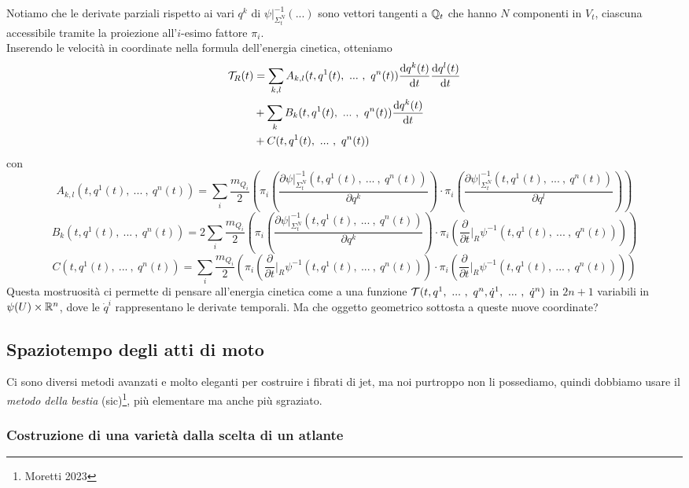 \documentclass[openany]{book}
\begin{document}
Notiamo che le derivate parziali rispetto ai vari $q^k$ di $\psi|_{\Sigma_t^N}^{-1}(...)$ sono vettori tangenti a $\mathbb{Q}_t$ che hanno $N$ componenti in $V_t$, ciascuna accessibile tramite la proiezione all'$i$-esimo fattore $\pi_i$.\\
Inserendo le velocità in coordinate nella formula dell'energia cinetica, otteniamo 
\begin{align*}
    \T_R(t) & = \sum_{k,l} A_{k,l}(t, q^1(t),\ ...\ ,\  q^n(t))\frac{\di q^k(t)}{\di t}\frac{\di q^l(t)}{\di t} \\ & +  \sum_k B_k(t, q^1(t),\ ...\ ,\  q^n(t)) \frac{\di q^k(t)}{\di t} \\ & + C(t, q^1(t),\ ...\ ,\  q^n(t))
\end{align*}
con 
\[ A_{k,l}(t, q^1(t),\ ...\ ,\  q^n(t)) = \sum_i \frac{m_{Q_i}}{2}  \left( \pi_i\left( \frac{\partial \psi|_{\Sigma_t^N}^{-1}(t,q^1(t),\ ...\ ,\ q^n(t)) }{\partial q^k} \right) \cdot \pi_i\left( \frac{\partial \psi|_{\Sigma_t^N}^{-1}(t,q^1(t),\ ...\ ,\ q^n(t)) }{\partial q^l} \right) \right) \]
\[ B_k(t, q^1(t),\ ...\ ,\  q^n(t)) = 2\sum_i \frac{m_{Q_i}}{2}  \left( \pi_i\left( \frac{\partial \psi|_{\Sigma_t^N}^{-1}(t,q^1(t),\ ...\ ,\ q^n(t)) }{\partial q^k} \right) \cdot \pi_i\left( \frac{\partial }{\partial t}\bigg|_R\psi^{-1}(t,q^1(t),\ ...\ ,\ q^n(t))  \right) \right) \]
\[ C(t, q^1(t),\ ...\ ,\  q^n(t)) = \sum_i \frac{m_{Q_i}}{2}  \left( \pi_i\left( \frac{\partial }{\partial t}\bigg|_R\psi^{-1}(t,q^1(t),\ ...\ ,\ q^n(t)) \right) \cdot \pi_i\left( \frac{\partial }{\partial t}\bigg|_R\psi^{-1}(t,q^1(t),\ ...\ ,\ q^n(t))  \right) \right) \]
Questa mostruosità ci permette di pensare all'energia cinetica come a una funzione $\mathcal{T}(t,q^1,\ ...\ ,\ q^n,\dot q^1,\ ...\ ,\ \dot q^n)$ in $2n+1$ variabili in $\psi(U)\times\mathbb{R}^n$, dove le $\dot q^i$ rappresentano le derivate temporali. Ma che oggetto geometrico sottosta a queste nuove coordinate?

\subsection{Spaziotempo degli atti di moto}

Ci sono diversi metodi avanzati e molto eleganti per costruire i fibrati di jet, ma noi purtroppo non li possediamo, quindi dobbiamo usare il \textit{metodo della bestia} (sic)\footnote{Moretti 2023}, più elementare ma anche più sgraziato.

\subsubsection{Costruzione di una varietà dalla scelta di un atlante}
\end{document}
